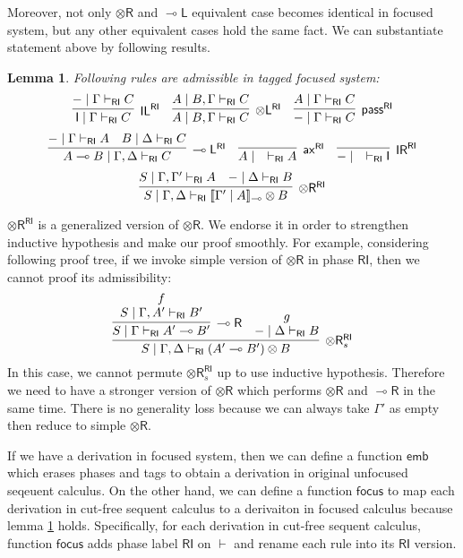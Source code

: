 \documentclass[submission,copyright,creativecommons]{eptcs}
\newtheorem{lemma}[theorem]{Lemma}
\newcommand{\ldbc}{[\![}
\newcommand{\rdbc}{]\!]}
\newcommand{\tl}{\otimes \mathsf{L}}
\newcommand{\tr}{\otimes \mathsf{R}}
\newcommand{\lright}{\multimap \mathsf{R}}
\newcommand{\lleft}{\multimap \mathsf{L}}
\newcommand{\pass}{\mathsf{pass}}
\newcommand{\unitl}{\mathsf{IL}}
\newcommand{\unitr}{\mathsf{IR}}
\newcommand{\ax}{\mathsf{ax}}
\newcommand{\ot}{\otimes}
\newcommand{\lolli}{\multimap}
\newcommand{\I}{\mathsf{I}}
\newcommand{\RI}{\mathsf{RI}}
\begin{document}
Moreover, not only $\tr$ and $\lleft$ equivalent case becomes identical in focused system, but any other equivalent cases hold the same fact.
We can substantiate statement above by following results.
\begin{lemma}\label{AdmissibleInRI}
  Following rules are admissible in tagged focused system:
  \begin{displaymath}
    \infer[\unitl^{\RI}]{\I \mid \Gamma \vdash_{\RI} C}{- \mid \Gamma \vdash_{\RI} C}
    \quad
    \infer[\tl^{\RI}]{A \mid B, \Gamma \vdash_{\RI} C}{A \mid B, \Gamma \vdash_{\RI} C}
    \quad
    \infer[\pass^{\RI}]{- \mid \Gamma \vdash_{\RI} C}{A \mid \Gamma \vdash_{\RI} C}
  \end{displaymath}
  \begin{displaymath}
    \infer[\lleft^{\RI}]{A \lolli B \mid \Gamma , \Delta \vdash_{\RI} C}{
    - \mid \Gamma \vdash_{\RI} A
    &
    B \mid \Delta \vdash_{\RI} C
    }
    \quad
    \infer[\ax^{\RI}]{A \mid \quad \vdash_{\RI} A}{}
    \quad
    \infer[\unitr^{\RI}]{- \mid \quad \vdash_{\RI} \I}{}
  \end{displaymath}
  \begin{displaymath}
    \infer[\tr^{\RI}]{S \mid \Gamma , \Delta \vdash_{\RI} \ldbc \Gamma' \mid A \rdbc_{\lolli} \ot B}{
      S \mid \Gamma , \Gamma' \vdash_{\RI} A
      &
      - \mid \Delta \vdash_{\RI} B
    }
  \end{displaymath}
\end{lemma}

$\tr^{\RI}$ is a generalized version of $\tr$.
We endorse it in order to strengthen inductive hypothesis and make our proof smoothly.
For example, considering following proof tree, if we invoke simple version of $\tr$ in phase $\RI$, then we cannot proof its admissibility:
\begin{displaymath}
  \infer[\tr^{\RI}_s]{S \mid \Gamma , \Delta \vdash_{\RI} (A' \lolli B') \ot B}{
    \infer[\lright]{S \mid \Gamma \vdash_{\RI} A' \lolli B'}{
      \deduce{S \mid \Gamma , A' \vdash_{\RI} B'}{f}
    }
    &
    \deduce{- \mid \Delta \vdash_{\RI} B}{g}
  }
\end{displaymath}
In this case, we cannot permute $\tr^{\RI}_s$ up to use inductive hypothesis.
Therefore we need to have a stronger version of $\tr$ which performs $\tr$ and $\lright$ in the same time.
There is no generality loss because we can always take $\Gamma'$ as empty then reduce to simple $\tr$.

If we have a derivation in focused system, then we can define a function $\mathsf{emb}$ which erases phases and tags to obtain a derivation in original unfocused seqeuent calculus.
On the other hand, we can define a function $\mathsf{focus}$ to map each derivation in cut-free sequent calculus to a derivaiton in focused calculus because lemma \ref{AdmissibleInRI} holds.
Specifically, for each derivation in cut-free sequent calculus, function $\mathsf{focus}$ adds phase label $\RI$ on $\vdash$ and rename each rule into its $\RI$ version.
\end{document}
